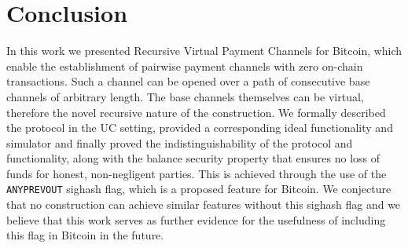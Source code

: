 \section{Conclusion}
  In this work we presented Recursive Virtual Payment Channels for Bitcoin,
  which enable the establishment of pairwise payment channels with zero on-chain
  transactions. Such a channel can be opened over a path of consecutive base
  channels of arbitrary length. The base channels themselves can be virtual,
  therefore the novel recursive nature of the construction. We formally
  described the protocol in the UC setting, provided a corresponding ideal
  functionality and simulator and finally proved the indistinguishability of the
  protocol and functionality, along with the balance security property that
  ensures no loss of funds for honest, non-negligent parties. This is achieved
  through the use of the \texttt{ANYPREVOUT} sighash flag, which is a proposed
  feature for Bitcoin. We conjecture that no construction can achieve similar
  features without this sighash flag and we believe that this work serves as
  further evidence for the usefulness of including this flag in Bitcoin in the
  future.
